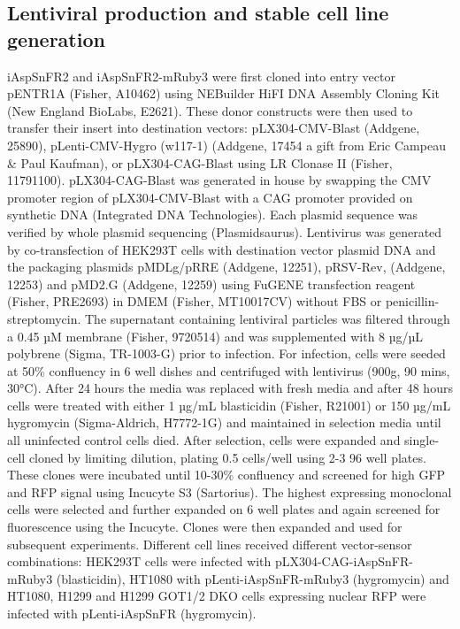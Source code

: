 \documentclass[9pt,lineno]{elife}
\begin{document}
\subsection{Lentiviral production and stable cell line generation}
iAspSnFR2 and iAspSnFR2-mRuby3 were first cloned into entry vector pENTR1A (Fisher, A10462) using NEBuilder HiFI DNA Assembly Cloning Kit (New England BioLabs, E2621).
These donor constructs were then used to transfer their insert into destination vectors: pLX304-CMV-Blast (Addgene, 25890), pLenti-CMV-Hygro (w117-1) (Addgene, 17454 a gift from Eric Campeau \& Paul Kaufman), or pLX304-CAG-Blast using LR Clonase II (Fisher, 11791100).
pLX304-CAG-Blast was generated in house by swapping the CMV promoter region of pLX304-CMV-Blast with a CAG promoter provided on synthetic DNA (Integrated DNA Technologies).
Each plasmid sequence was verified by whole plasmid sequencing (Plasmidsaurus).
Lentivirus was generated by co-transfection of HEK293T cells with destination vector plasmid DNA and the packaging plasmids pMDLg/pRRE (Addgene, 12251), pRSV-Rev, (Addgene, 12253) and pMD2.G (Addgene, 12259) using FuGENE transfection reagent (Fisher, PRE2693) in DMEM (Fisher, MT10017CV) without FBS or penicillin-streptomycin.
The supernatant containing lentiviral particles was filtered through a 0.45 µM membrane (Fisher, 9720514) and was supplemented with 8 µg/µL polybrene (Sigma, TR-1003-G) prior to infection.
For infection, cells were seeded at 50\% confluency in 6 well dishes and centrifuged with lentivirus (900g, 90 mins, 30°C).
After 24 hours the media was replaced with fresh media and after 48 hours cells were treated with either 1 µg/mL blasticidin (Fisher, R21001) or 150 µg/mL hygromycin (Sigma-Aldrich, H7772-1G) and maintained in selection media until all uninfected control cells died.
After selection, cells were expanded and single-cell cloned by limiting dilution, plating 0.5 cells/well using 2-3 96 well plates.
These clones were incubated until 10-30\% confluency and screened for high GFP and RFP signal using Incucyte S3 (Sartorius).
The highest expressing monoclonal cells were selected and further expanded on 6 well plates and again screened for fluorescence using the Incucyte.
Clones were then expanded and used for subsequent experiments.
Different cell lines received different vector-sensor combinations: HEK293T cells were infected with pLX304-CAG-iAspSnFR-mRuby3 (blasticidin), HT1080 with pLenti-iAspSnFR-mRuby3 (hygromycin) and HT1080, H1299 and H1299 GOT1/2 DKO cells expressing nuclear RFP were infected with pLenti-iAspSnFR (hygromycin).
\end{document}
